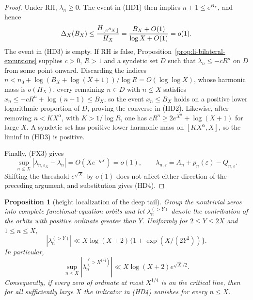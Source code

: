 \documentclass[11pt]{amsart}
\newtheorem{proposition}[theorem]{Proposition}
\theoremstyle{definition}
\theoremstyle{remark}
\theoremstyle{definition}
\begin{document}
\begin{proof}
Under RH, $\lambda_n\ge0$.  The event in (HD1) then implies
$n+1\le e^{B_X}$, and hence
\[
 \Delta_X(B_X)\le {H_{\lfloor e^{B_X}\rfloor}\over H_X}
 ={B_X+O(1)\over\log X+O(1)}=o(1).
\]
The event in (HD3) is empty.  If RH is false,
Proposition~\ref{prop:li-bilateral-excursions} supplies $c>0$, $R>1$ and
a syndetic set $D$ such that $\lambda_n\le-cR^n$ on $D$ from some point
onward.  Discarding the indices
$n<n_0+\log(B_X+\log(X+1))/\log R=O(\log\log X)$, whose harmonic mass is
$o(H_X)$, every remaining $n\in D$ with $n\le X$ satisfies
$x_n\le-cR^n+\log(n+1)\le B_X$, so the event $x_n\le B_X$ holds on a
positive lower logarithmic proportion of $D$, proving
the converse in (HD2).  Likewise, after removing
$n<KX^\alpha$, with $K>1/\log R$, one has
$cR^n\ge2e^{X^\alpha}+\log(X+1)$ for large $X$.  A syndetic set has
positive lower harmonic mass on $[KX^\alpha,X]$, so the liminf in (HD3)
is positive.

Finally, (FX3) gives
\[
 \sup_{n\le X}|\lambda_{n,\varepsilon_X}-\lambda_n|
 =O(Xe^{-\eta X})=o(1),
 \qquad
 \lambda_{n,\varepsilon}=A_n+p_n(\varepsilon)-Q_{n,\varepsilon}.
\]
Shifting the threshold $e^{\sqrt X}$ by $o(1)$ does not affect either
direction of the preceding argument, and substitution gives (HD4).
\end{proof}

\begin{proposition}[height localization of the deep tail]
\label{prop:li-deep-height-localization}
Group the nontrivial zeros into complete functional-equation orbits and let
$\lambda_n^{(>Y)}$ denote the contribution of the orbits with positive
ordinate greater than $Y$.  Uniformly for $2\le Y\le2X$ and $1\le n\le X$,
\[
 \boxed{
 |\lambda_n^{(>Y)}|\ll
 X\log(X+2)\{1+\exp(X/(2Y^2))\}.}                         \tag{HL1}
\]
In particular,
\[
 \sup_{n\le X}|\lambda_n^{(>X^{1/4})}|
 \ll X\log(X+2)e^{\sqrt X/2}.                            \tag{HL2}
\]
Consequently, if every zero of ordinate at most $X^{1/4}$ is on the
critical line, then for all sufficiently large $X$ the indicator in (HD4)
vanishes for every $n\le X$.
\end{proposition}
\end{document}
